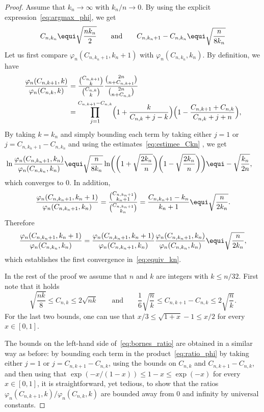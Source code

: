 \begin{proof}
Assume that $k_n\to\infty$ with $k_n/n\to0$. By using the explicit expression~\eqref{eq:argmax_phi}, we get
\begin{equation}\label{eq:estimee_Ckn}
C_{n,k_n} \equi \sqrt{\frac{n k_n}{2}}
\qquad\text{and}\qquad
C_{n,k_n+1} - C_{n,k_n} \equi \sqrt{\frac{n}{8 k_n }}
\end{equation}
Let us first compare $\varphi_{n}(C_{n,k_{n}+1},k_{n}+1)$ with $\varphi_{n}(C_{n,k_{n}},k_{n})$. By definition, we have
\begin{equation}\label{eq:ratio_phi}
\begin{split}
\frac{\varphi_{n}(C_{n,k+1},k)}{\varphi_{n}(C_{n,k},k)}
&= \frac{\binom{C_{n,k+1}}{k}}{\binom{C_{n,k}}{k}} \frac{\binom{2n}{n+C_{n,k+1}}}{\binom{2n}{n+C_{n,k}}}\\
&= \prod_{j=1}^{C_{n,k+1}-C_{n,k}} \Bigl(1+\frac{k}{C_{n,k}+j-k} \Bigr) \Bigl(1- \frac{C_{n,k+1}+C_{n,k}}{C_{n,k}+j+n}\Bigr),
\end{split}
\end{equation}
By taking $k=k_{n}$ and simply bounding each term by taking either $j=1$ or $j=C_{n,k_{n}+1}-C_{n,k_{n}}$ and using the estimates~\eqref{eq:estimee_Ckn} , we get
\begin{align*}
\ln \frac{\varphi_{n}(C_{n,k_n+1},k_n)}{\varphi_{n}(C_{n,k_n},k_n)}
&\equi \sqrt{\frac{n}{8k_n}} \ln\biggl(\biggl(1+\sqrt{\frac{2k_n}{n}}\biggr) \biggl(1-\sqrt{\frac{2k_n}{n}}\biggr)\biggr)
\equi - \sqrt{\frac{k_n}{2n}},
\end{align*}
which converges to $0$. In addition,
\[
\frac{\varphi_{n}(C_{n,k_n+1},k_n+1)}{\varphi_{n}(C_{n,k_n+1},k_n)}
= \frac{\binom{C_{n,k_n+1}}{k_n+1}}{\binom{C_{n,k_n+1}}{k_n}}
= \frac{C_{n,k_n+1} - k_n}{k_n+1}
\equi \sqrt{\frac{n}{2k_n}}.
\]
Therefore
\[
\frac{\varphi_{n}(C_{n,k_n+1},k_n+1)}{\varphi_{n}(C_{n,k_n},k_n)}
= \frac{\varphi_{n}(C_{n,k_n+1},k_n+1)}{\varphi_{n}(C_{n,k_n+1},k_n)} \frac{\varphi_{n}(C_{n,k_n+1},k_n)}{\varphi_{n}(C_{n,k_n},k_n)}
\equi \sqrt{\frac{n}{2k_n}},
\]
which establishes the first convergence in~\eqref{eq:equiv_kn}.

In the rest of the proof we assume that $n$ and $k$ are integers with $k \le n/32$. First note that it holds
\[
\sqrt{\frac{n k}{8}}
\le C_{n,k}
\le 2 \sqrt{n k}
\qquad\text{and}\qquad
\frac{1}{6} \sqrt{\frac{n}{k}} \le C_{n,k+1} - C_{n,k} \le 2 \sqrt{\frac{n}{k}}.
\]
For the last two bounds, one can use that $x/3 \le \sqrt{1+x} - 1 \le x/2$ for every $x \in[0,1]$.

The bounds on the left-hand side of~\eqref{eq:bornes_ratio} are obtained in a similar way as before: by bounding each term in the product~\eqref{eq:ratio_phi} by taking either $j=1$ or $j=C_{n,k+1}-C_{n,k}$, using the bounds on $C_{n,k}$ and $C_{n,k+1}-C_{n,k}$, and then using that $\exp(-x/(1-x)) \le 1-x \le \exp(-x)$ for every $x \in [0,1]$, it is straightforward, yet tedious, to show that the ratios
$\varphi_{n}(C_{n,k+1},k)/\varphi_{n}(C_{n,k},k)$
are bounded away from $0$ and infinity by universal constants.


\end{proof}
